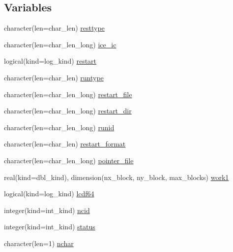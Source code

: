 \subsection*{Variables}
\begin{DoxyCompactItemize}
\item 
character(len=char\_\-len) \hyperlink{namespaceice__restart_aad4e3d73d50c4539a7b1aa3107da64d2}{resttype}
\item 
character(len=char\_\-len\_\-long) \hyperlink{namespaceice__restart_a7b5bbbfe819de3da4a61882a1c69631d}{ice\_\-ic}
\item 
logical(kind=log\_\-kind) \hyperlink{namespaceice__restart_a929c8d9ca4d216b9f6b0e99e89e714fb}{restart}
\item 
character(len=char\_\-len) \hyperlink{namespaceice__restart_a549fe78d0644ff3e150fb73b66c04f1d}{runtype}
\item 
character(len=char\_\-len\_\-long) \hyperlink{namespaceice__restart_afe746728ab31bdadb08208876f3b7f12}{restart\_\-file}
\item 
character(len=char\_\-len\_\-long) \hyperlink{namespaceice__restart_a3a3e9af457ad6b50bfb6574e2d3809c2}{restart\_\-dir}
\item 
character(len=char\_\-len\_\-long) \hyperlink{namespaceice__restart_a7f22ff2f3f9c3ccf57b19309c46deb79}{runid}
\item 
character(len=char\_\-len) \hyperlink{namespaceice__restart_a959bc8a517154ec9d4ab801d5bb2c55f}{restart\_\-format}
\item 
character(len=char\_\-len\_\-long) \hyperlink{namespaceice__restart_a3c4214640f255c7d756076f72b205d0b}{pointer\_\-file}
\item 
real(kind=dbl\_\-kind), dimension(nx\_\-block, ny\_\-block, max\_\-blocks) \hyperlink{namespaceice__restart_a1703b86ac88cd5909cf72e10e6ff140f}{work1}
\item 
logical(kind=log\_\-kind) \hyperlink{namespaceice__restart_aab78d8960dc993e85a64bb42c7031faf}{lcdf64}
\item 
integer(kind=int\_\-kind) \hyperlink{namespaceice__restart_a51c2dfdd011da9a81944ec89a678cc41}{ncid}
\item 
integer(kind=int\_\-kind) \hyperlink{namespaceice__restart_ae323f5dd85b87df694fafe6e4f453e70}{status}
\item 
character(len=1) \hyperlink{namespaceice__restart_a26947e34bc78295d6dad27b3b0295209}{nchar}
\end{DoxyCompactItemize}


